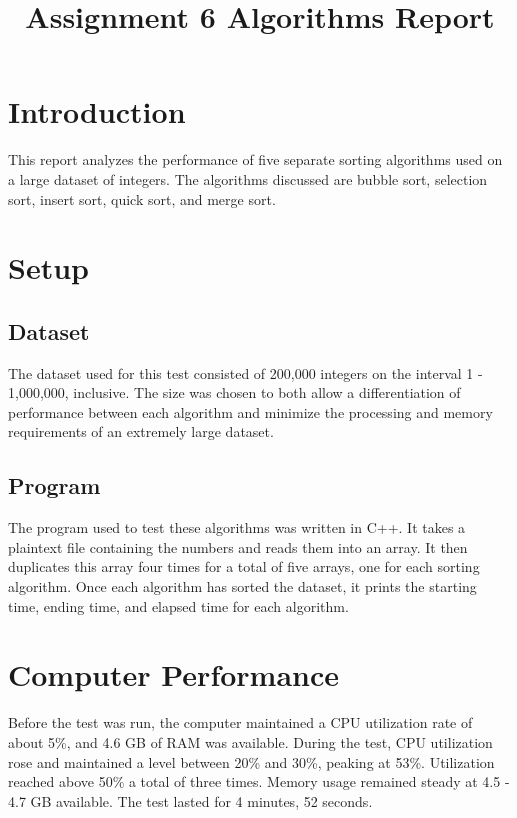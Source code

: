 \documentclass[conference]{IEEEtran}
\begin{document}
\title{Assignment 6 Algorithms Report\\
}

\author{
}

\maketitle

\section{Introduction}
This report analyzes the performance of five separate sorting algorithms used on a large
dataset of integers. The algorithms discussed are bubble sort, selection sort, insert 
sort, quick sort, and merge sort.

\section{Setup}

\subsection{Dataset}
The dataset used for this test consisted of 200,000 integers on the interval 1 - 
1,000,000, inclusive. The size was chosen to both allow a differentiation of performance
between each algorithm and minimize the processing and memory requirements of an 
extremely large dataset.

\subsection{Program}
The program used to test these algorithms was written in C++. It takes a plaintext file
containing the numbers and reads them into an array. It then duplicates this array four
times for a total of five arrays, one for each sorting algorithm. Once each algorithm
has sorted the dataset, it prints the starting time, ending time, and elapsed time for 
each algorithm.

\section{Computer Performance}
Before the test was run, the computer maintained a CPU utilization rate of about 5\%, 
and 4.6 GB of RAM was available. During the test, CPU utilization rose and maintained a
level between 20\% and 30\%, peaking at 53\%. Utilization reached above 50\% a total of
three times. Memory usage remained steady at 4.5 - 4.7 GB available. The test lasted
for 4 minutes, 52 seconds.
\end{document}
